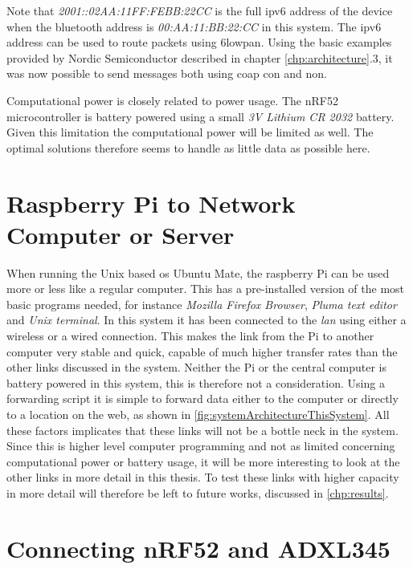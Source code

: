 Note that \textit{2001::02AA:11FF:FEBB:22CC} is the full \gls{ipv6} address of the device when the bluetooth address is \textit{00:AA:11:BB:22:CC} in this system. The \gls{ipv6} address can be used to route packets using \gls{6lowpan}. Using the basic examples provided by Nordic Semiconductor described in chapter \ref{chp:architecture}.3, it was now possible to send messages both using \gls{coap} \gls{con} and \gls{non}.  

Computational power is closely related to power usage. The nRF52 microcontroller is battery powered using a small \textit{3V Lithium CR 2032} battery. Given this limitation the computational power will be limited as well. The optimal solutions therefore seems to handle as little data as possible here. 

\section{Raspberry Pi to Network Computer or Server}

When running the Unix based \gls{os} Ubuntu Mate, the raspberry Pi can be used more or less like a regular computer. This has a pre-installed version of the most basic programs needed, for instance \textit{Mozilla Firefox Browser}, \textit{Pluma text editor} and \textit{Unix terminal}. In this system it has been connected to the \textit{lan} using either a wireless or a wired connection. This makes the link from the Pi to another computer very stable and quick, capable of much higher transfer rates than the other links discussed in the system. Neither the Pi or the central computer is battery powered in this system, this is therefore not a consideration. Using a forwarding script it is simple to forward data either to the computer or directly to a location on the web, as shown in \ref{fig:systemArchitectureThisSystem}. All these factors implicates that these links will not be a bottle neck in the system. Since this is higher level computer programming and not as limited concerning computational power or battery usage, it will be more interesting to look at the other links in more detail in this thesis. To test these links with higher capacity in more detail will therefore be left to future works, discussed in \ref{chp:results}. 

\newpage

\section{Connecting nRF52 and ADXL345}

